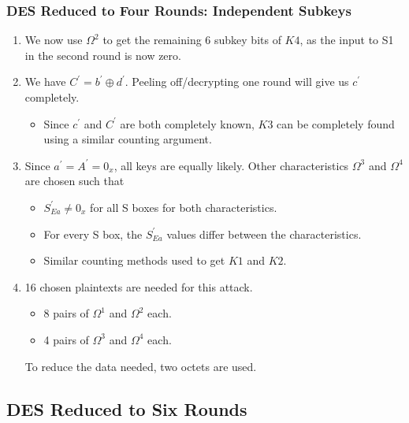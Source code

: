 \documentclass{beamer}
\begin{document}
	\begin{frame}
		\frametitle{DES Reduced to Four Rounds: Independent Subkeys}
		\begin{enumerate}
			\item<1-> We now use \(\Omega^2\) to get the remaining 6 subkey bits
			of \(K4\), as the input to S1 in the second round is now zero.
			\item<2-> We have \(C^\prime = b^\prime \oplus d^\prime\). Peeling
			off/decrypting one round will give us \(c^\prime\) completely.
			\begin{itemize}
				\item<3-> Since \(c^\prime\) and \(C^\prime\) are both
				completely known, \(K3\) can be completely found using a similar
				counting argument.
			\end{itemize}
			\item<4-> Since \(a^\prime = A^\prime = 0_x\), all keys are equally
			likely. Other characteristics \(\Omega^3\) and \(\Omega^4\) are
			chosen such that
			\begin{itemize}
				\item \(S_{Ea}^\prime \neq 0_x\) for all S boxes for both
				characteristics.
				\item For every S box, the \(S_{Ea}^\prime\) values differ
				between the characteristics.
				\item Similar counting methods used to get \(K1\) and \(K2\).
			\end{itemize}
			\item<5-> 16 chosen plaintexts are needed for this attack.
			\begin{itemize}
				\item 8 pairs of \(\Omega^1\) and \(\Omega^2\) each.
				\item 4 pairs of \(\Omega^3\) and \(\Omega^4\) each.
			\end{itemize}
			To reduce the data needed, two octets are used.
		\end{enumerate}
	\end{frame}

	\subsection{DES Reduced to Six Rounds}
\end{document}
